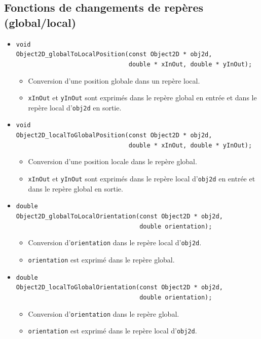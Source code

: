 \documentclass[12pt]{article}
\begin{document}
\subsection{Fonctions de changements de rep\`eres (global/local)}

\begin{itemize}

\item \verb!void! \\
      \verb!Object2D_globalToLocalPosition(const Object2D * obj2d,! \\
      \verb!                               double * xInOut, double * yInOut);!
      \begin{itemize}
      \item Conversion d'une position globale dans un rep\`ere local.
      \item \verb!xInOut! et \verb!yInOut! sont exprim\'es dans le rep\`ere
            global en entr\'ee et dans le rep\`ere local d'\verb!obj2d! en
            sortie.
      \end{itemize}
\item \verb!void! \\
      \verb!Object2D_localToGlobalPosition(const Object2D * obj2d,! \\
      \verb!                               double * xInOut, double * yInOut);!
      \begin{itemize}
      \item Conversion d'une position locale dans le rep\`ere global.
      \item \verb!xInOut! et \verb!yInOut! sont exprim\'es dans le rep\`ere
            local d'\verb!obj2d! en entr\'ee et dans le rep\`ere global en
            sortie.
      \end{itemize}
\item \verb!double! \\
      \verb!Object2D_globalToLocalOrientation(const Object2D * obj2d,! \\
      \verb!                                  double orientation);!
      \begin{itemize}
      \item Conversion d'\verb!orientation! dans le rep\`ere local
            d'\verb!obj2d!.
      \item \verb!orientation! est exprim\'e dans le rep\`ere global.
      \end{itemize}
\item \verb!double! \\
      \verb!Object2D_localToGlobalOrientation(const Object2D * obj2d,! \\
      \verb!                                  double orientation);!
      \begin{itemize}
      \item Conversion d'\verb!orientation! dans le rep\`ere global.
      \item \verb!orientation! est exprim\'e dans le rep\`ere local
            d'\verb!obj2d!.
      \end{itemize}

\end{itemize}
\end{document}
